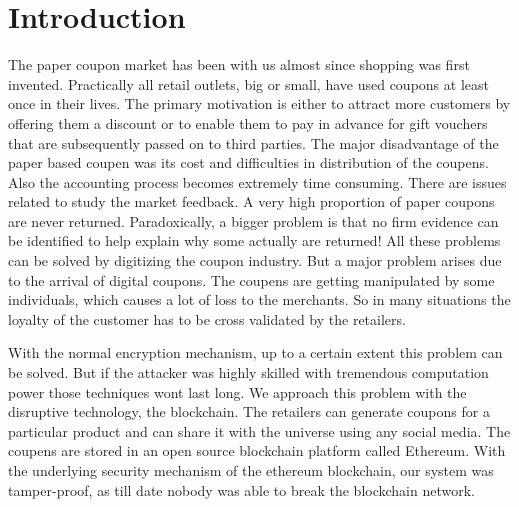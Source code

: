 \chapter{Introduction}
\par
The paper coupon market has been with us almost since shopping was first invented. Practically all retail outlets, big or small, have used coupons at least once in their lives. The primary motivation is either to attract more customers by offering them a discount or to enable them to pay in advance for gift vouchers that are subsequently passed on to third parties. The major disadvantage of the paper based coupen was its cost and difficulties in distribution of the coupens. Also the accounting process becomes extremely time consuming. There are issues related to study the market feedback.  A very high proportion of paper coupons are never returned. Paradoxically, a bigger problem is that no firm evidence can be identified to help explain why some actually are returned! All these problems can be solved by digitizing the coupon industry. But a major problem arises due to the arrival of digital coupons. The coupens are getting manipulated by some individuals, which causes a lot of loss to the merchants. So in many situations the loyalty of the customer has to be cross validated by the retailers. 

\par
With the normal encryption mechanism, up to a certain extent this problem can be solved. But if the attacker was highly skilled with tremendous computation power those techniques wont last long. We approach this problem with the disruptive technology, the blockchain. The retailers can generate coupons for a particular product and can share it with the universe using any social media. The coupens are stored in an open source blockchain platform called Ethereum. With the underlying security mechanism of the ethereum blockchain, our system was tamper-proof, as till date nobody was able to break the blockchain network.
